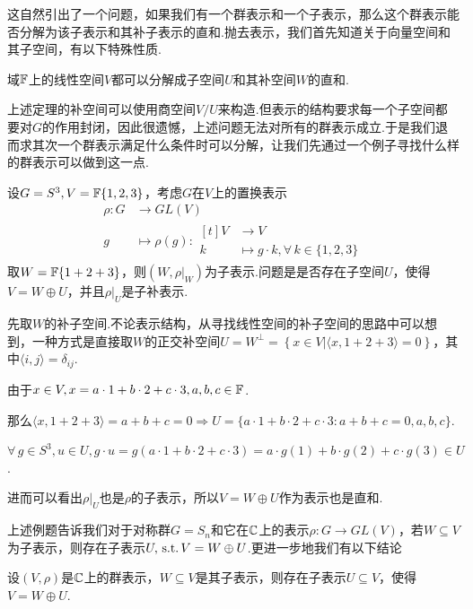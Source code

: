 这自然引出了一个问题，如果我们有一个群表示和一个子表示，那么这个群表示能否分解为该子表示和其补子表示的直和.抛去表示，我们首先知道关于向量空间和其子空间，有以下特殊性质.
\begin{theorem}[]
    域$\mathbb{F}$上的线性空间$V$都可以分解成子空间$U$和其补空间$W$的直和.
\end{theorem}
上述定理的补空间可以使用商空间$V/U$来构造.但表示的结构要求每一个子空间都要对$G$的作用封闭，因此很遗憾，上述问题无法对所有的群表示成立.于是我们退而求其次一个群表示满足什么条件时可以分解，让我们先通过一个例子寻找什么样的群表示可以做到这一点.
\begin{instance}
    设$G=S^3,V=\mathbb{F}\{1,2,3\}$，考虑$G$在$V$上的置换表示
    \begin{align*}
    \rho:G&\to GL(V) \\[-8pt]
    g &\mapsto \rho(g):\begin{aligned}[t]
    V&\to V \\[-10pt]
    k&\mapsto g\cdot k,\forall\, k\in\{1,2,3\}
    \end{aligned}
    \end{align*}
    取$W=\mathbb{F}\{1+2+3\}$，则$(W,\rho|_W)$为子表示.问题是是否存在子空间$U$，使得$V=W\oplus U$，并且$\rho|_U$是子补表示.\par
    先取$W$的补子空间.不论表示结构，从寻找线性空间的补子空间的思路中可以想到，一种方式是直接取$W$的正交补空间$U=W^\perp=\left\{x\in V|\langle x,1+2+3\rangle=0\right\}$，其中$\langle i,j\rangle =\delta_{ij}$.\par
    由于$x\in V,x=a\cdot 1+b\cdot 2+c\cdot 3,a,b,c\in\mathbb{F}$.\par
    那么$\langle x,1+2+3\rangle=a+b+c=0\Rightarrow U=\{a\cdot 1+b\cdot 2+c\cdot 3:a+b+c=0,a,b,c\}$.\par
    $\forall\,g\in S^3,u\in U,g\cdot u=g(a\cdot 1+b\cdot 2+c\cdot 3)=a\cdot g(1)+b\cdot g(2)+c\cdot g(3)\in U$.\par
    进而可以看出$\rho|_U$也是$\rho$的子表示，所以$V=W\oplus U$作为表示也是直和.
\end{instance}
上述例题告诉我们对于对称群$G=S_n$和它在$\mathbb{C}$上的表示$\rho:G\to GL(V)$，若$W\subseteq V$为子表示，则存在子表示$U,\operatorname{\,\text{s.t.}} V=W\oplus U$.更进一步地我们有以下结论
\begin{theorem}
    设$(V,\rho)$是$\mathbb{C}$上的群表示，$W\subseteq V$是其子表示，则存在子表示$U\subseteq V$，使得$V=W\oplus U$.
\end{theorem}
